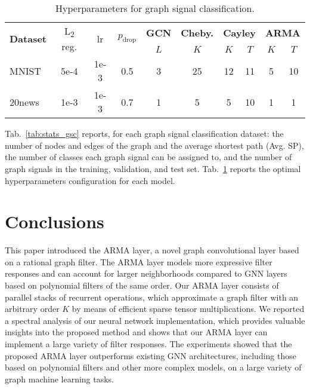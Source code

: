 \documentclass{article}
\begin{document}
\begin{table}[!ht]
\setlength\tabcolsep{.2em} \small
\centering
\caption{Hyperparameters for graph signal classification.}
\bgroup
\def\arraystretch{1.0} \begin{tabular}{lccc|c|c|cc|cc}
\cmidrule[1.5pt]{1-10}
\multirow{ 2}{*}{\textbf{Dataset}} & \multirow{ 2}{*}{L\textsubscript{2} reg.} & \multirow{ 2}{*}{lr} & \multirow{ 2}{*}{$p_\text{drop}$} & \textbf{GCN} & \textbf{Cheby.} & \multicolumn{2}{c|}{\textbf{Cayley}} & \multicolumn{2}{c}{\textbf{ARMA}} \\
& & & & $L$ & $K$ & $K$ & $T$ & $K$ & $T$ \\
\midrule
MNIST    & 5e-4 & 1e-3 & 0.5  & 3 & 25 & 12 & 11 & 5 & 10 \\ 20news   & 1e-3 & 1e-3 & 0.7  & 1 & 5  & 5  & 10  & 1 & 1  \\ \cmidrule[1.5pt]{1-10}
\end{tabular}
\label{tab:hyper_gsc}
\egroup
\end{table}


Tab.~\ref{tab:stats_gsc} reports, for each graph signal classification dataset: the number of nodes and edges of the graph and the average shortest path (Avg. SP), the number of classes each graph signal can be assigned to, and the number of graph signals in the training, validation, and test set.
Tab.~\ref{tab:hyper_gsc} reports the optimal hyperparameters configuration for each model.

\section{Conclusions}
\label{sec:conclusion}

This paper introduced the ARMA layer, a novel graph convolutional layer based on a rational graph filter.
The ARMA layer models more expressive filter responses and can account for larger neighborhoods compared to GNN layers based on polynomial filters of the same order.
Our ARMA layer consists of parallel stacks of recurrent operations, which approximate a graph filter with an arbitrary order $K$ by means of efficient sparse tensor multiplications. 
We reported a spectral analysis of our neural network implementation, which provides valuable insights into the proposed method and shows that our ARMA layer can implement a large variety of filter responses.
The experiments showed that the proposed ARMA layer outperforms existing GNN architectures, including those based on polynomial filters and other more complex models, on a large variety of graph machine learning tasks. 



\end{document}
